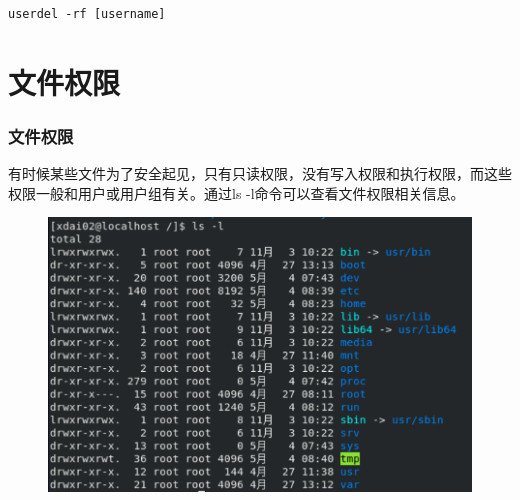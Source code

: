 \documentclass[12pt, openany, oneside]{book}
\begin{document}
\vspace{-0.5cm}

\begin{lstlisting}
userdel -rf [username]
\end{lstlisting}

\begin{table}[H]
    \centering
    \caption{userdel参数说明}
\end{table}

\newpage

\section{文件权限}

\subsubsection{文件权限}

有时候某些文件为了安全起见，只有只读权限，没有写入权限和执行权限，而这些权限一般和用户或用户组有关。通过ls -l命令可以查看文件权限相关信息。

\begin{figure}[H]
    \centering
    \includegraphics[scale=0.7]{img/Chapter5/5-2/1.png}
\end{figure}
\end{document}
